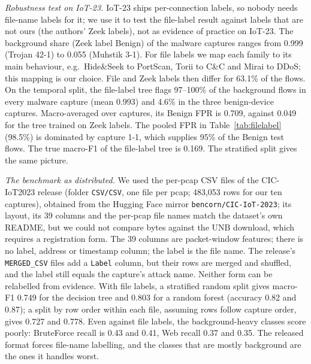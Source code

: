 \emph{Robustness test on IoT-23.} IoT-23 ships per-connection labels, so nobody needs file-name labels for it; we use it to test the file-label result against labels that are not ours (the authors' Zeek labels), not as evidence of practice on IoT-23. The background share (Zeek label Benign) of the malware captures ranges from 0.999 (Trojan 42-1) to 0.055 (Muhstik 3-1). For file labels we map each family to its main behaviour, e.g.\ Hide\&Seek to PortScan, Torii to C\&C and Mirai to DDoS; this mapping is our choice. File and Zeek labels then differ for 63.1\% of the flows. On the temporal split, the file-label tree flags 97--100\% of the background flows in every malware capture (mean 0.993) and 4.6\% in the three benign-device captures. Macro-averaged over captures, its Benign FPR is 0.709, against 0.049 for the tree trained on Zeek labels. The pooled FPR in Table~\ref{tab:filelabel} (98.5\%) is dominated by capture 1-1, which supplies 95\% of the Benign test flows. The true macro-F1 of the file-label tree is 0.169. The stratified split gives the same picture.

\emph{The benchmark as distributed.} We used the per-pcap CSV files of the CIC-IoT2023 release (folder \texttt{CSV/CSV}, one file per pcap; 483,053 rows for our ten captures), obtained from the Hugging Face mirror \texttt{bencorn/CIC-IoT-2023}; its layout, its 39 columns and the per-pcap file names match the dataset's own README, but we could not compare bytes against the UNB download, which requires a registration form. The 39 columns are packet-window features; there is no label, address or timestamp column; the label is the file name. The release's \texttt{MERGED\_CSV} files add a \texttt{Label} column, but their rows are merged and shuffled, and the label still equals the capture's attack name. Neither form can be relabelled from evidence. With file labels, a stratified random split gives macro-F1 0.749 for the decision tree and 0.803 for a random forest (accuracy 0.82 and 0.87); a split by row order within each file, assuming rows follow capture order, gives 0.727 and 0.778. Even against file labels, the background-heavy classes score poorly: BruteForce recall is 0.43 and 0.41, Web recall 0.37 and 0.35. The released format forces file-name labelling, and the classes that are mostly background are the ones it handles worst.
